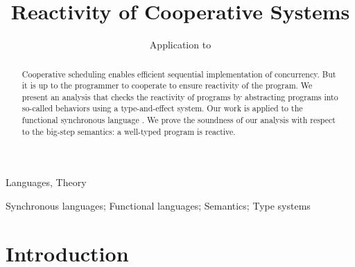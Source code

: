 \documentclass[9pt,preprint]{sigplanconf}
\begin{document}
\newtheorem{theorem}{Theorem}[section]
\newtheorem{property}{Property}
\newtheorem{lemma}{Lemma}
\newtheorem{hypothesis}{Hypothesis}

\theoremstyle{definition}
\newtheorem{definition}{Definition}

\title{Reactivity of Cooperative Systems}
\subtitle{Application to \rml}

\authorinfo{}{}{}

\maketitle

\begin{abstract}
Cooperative scheduling enables efficient sequential implementation of concurrency. But it is up to the programmer to cooperate to ensure reactivity of the program. We present an analysis that checks the reactivity of programs by abstracting programs into so-called behaviors using a type-and-effect system. Our work is applied to the functional synchronous language \rml. We prove the soundness of our analysis with respect to the big-step semantics: a well-typed program is reactive.
\end{abstract}


\terms
Languages, Theory

\keywords
Synchronous languages; Functional languages;  Semantics; Type systems

\section{Introduction}
\label{sec:introduction}
\end{document}
